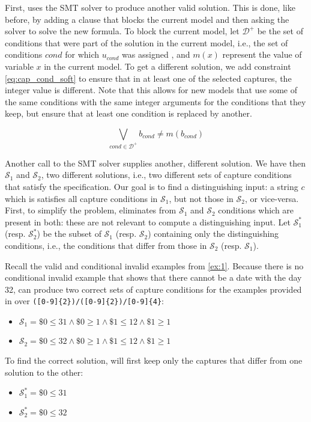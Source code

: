 First, \Forest uses the \ac{SMT} solver to produce another valid solution. This is done, like before, by adding a clause that blocks the current model and then asking the solver to solve the new formula.
%
To block the current model, let \(\mathcal{D^+}\) be the set of conditions that were part of the solution in the current model, i.e., the set of conditions \(\textit{cond}\) for which \(u_{\textit{cond}}\) was assigned \true, and \(m(x)\) represent the value of variable \(x\) in the current model.
To get a different solution, we add constraint \ref{eq:cap_cond_soft} to ensure that in at least one of the selected captures, the integer value is different. Note that this allows for new models that use some of the same conditions with the same integer arguments for the conditions that they keep, but ensure that at least one condition is replaced by another.

\begin{equation}\label{eq:cap_cond_soft}
\bigvee_{\textit{cond} \in \mathcal{D^+}} b_{\textit{cond}} \ne m(b_{\textit{cond}})
\end{equation}

Another call to the \ac{SMT} solver supplies another, different solution. We have then \(\mathcal{S}_1\) and \(\mathcal{S}_2\), two different solutions, i.e., two different sets of capture conditions that satisfy the specification. Our goal is to find a distinguishing input: a string \(c\) which is satisfies all capture conditions in \(\mathcal{S}_1\), but not those in \(\mathcal{S}_2\), or vice-versa. First, to simplify the problem, \Forest eliminates from \(\mathcal{S}_1\) and \(\mathcal{S}_2\) conditions which are present in both: these are not relevant to compute a distinguishing input. Let \(\mathcal{S}_1^*\) (resp. \(\mathcal{S}_2^*\)) be the subset of \(\mathcal{S}_1\) (resp. \(\mathcal{S}_2\)) containing only the distinguishing conditions, i.e., the conditions that differ from those in  \(\mathcal{S}_2\) (resp. \(\mathcal{S}_1\)).

\begin{example}\label{ex:cond_cap_keep_distinct}
Recall the valid and conditional invalid examples from \autoref{ex:1}. Because there is no conditional invalid example that shows that there cannot be a date with the day 32, \Forest can produce two correct sets of capture conditions for the examples provided in  over \verb`([0-9]{2})/([0-9]{2})/[0-9]{4}`:
\begin{itemize}
    \item \(\mathcal{S}_1 = \$0 \le 31 \wedge \$0 \ge 1 \wedge \$1 \le 12 \wedge \$1 \ge 1\)
    \item \(\mathcal{S}_2 = \$0 \le 32 \wedge \$0 \ge 1 \wedge \$1 \le 12 \wedge \$1 \ge 1\)
\end{itemize}
To find the correct solution, \Forest will first keep only the captures that differ from one solution to the other:
\begin{itemize}
    \item \(\mathcal{S}_1^* = \$0 \le 31\)
    \item \(\mathcal{S}_2^* = \$0 \le 32\)
\end{itemize}
\end{example}

